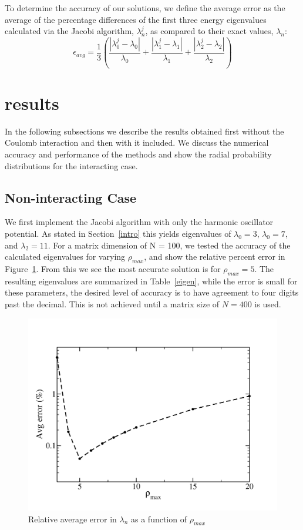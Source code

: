 \documentclass[prc,amsmath,twocolumn,superscriptaddress]{revtex4}
\begin{document}
To determine the accuracy of our solutions, we define the average error as the average of the percentage differences of the first three energy eigenvalues calculated via the Jacobi algorithm, $\lambda_n^j$, as compared to their exact values, $\lambda_n$:
\begin{equation}
\epsilon_{avg}=\frac{1}{3}\left(\frac{|\lambda_0^{j}-\lambda_0|}{\lambda_0}
+\frac{|\lambda_1^{j}-\lambda_1|}{\lambda_1} +\frac{|\lambda_2^{j}-\lambda_2|}{\lambda_2} \right)
\end{equation}

\section{results}
In the following subsections we describe the results obtained first without the Coulomb interaction and then with it included. We discuss the numerical accuracy and performance of the methods and show the radial probability distributions for the interacting case.
\label{results}
\subsection{Non-interacting Case}
We first implement the Jacobi algorithm with only the harmonic oscillator potential. As stated in Section~\ref{intro} this yields eigenvalues of $\lambda_0=3$, $\lambda_0=7$, and $\lambda_2=11$. For a matrix dimension of N = 100, we tested the accuracy of the calculated eigenvalues for varying $\rho_{max}$, and show the relative percent error in Figure~\ref{err}. From this we see the most accurate solution is for $\rho_{max}=5$. The resulting eigenvalues are summarized in Table~\ref{eigen}, while the error is small for these parameters, the desired level of accuracy is to have agreement to four digits past the decimal. This is not achieved until a matrix size of $N=400$ is used.

\begin{figure}[t]
\includegraphics[scale=0.33]{error_pmax.pdf}
\caption{Relative average error in $\lambda_n$ as a function of $\rho_{max}$}
\label{err}
\end{figure}
\end{document}
